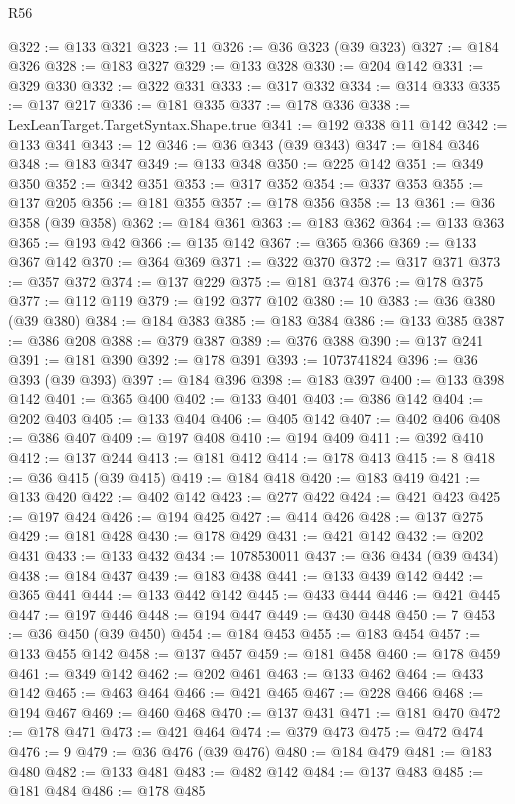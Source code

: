 \begin{lexlean}{R56}
\begin{coremodule}
@322 := @133 @321
@323 := 11
@326 := @36 @323 (@39 @323)
@327 := @184 @326
@328 := @183 @327
@329 := @133 @328
@330 := @204 @142
@331 := @329 @330
@332 := @322 @331
@333 := @317 @332
@334 := @314 @333
@335 := @137 @217
@336 := @181 @335
@337 := @178 @336
@338 := LexLeanTarget.TargetSyntax.Shape.true
@341 := @192 @338 @11 @142
@342 := @133 @341
@343 := 12
@346 := @36 @343 (@39 @343)
@347 := @184 @346
@348 := @183 @347
@349 := @133 @348
@350 := @225 @142
@351 := @349 @350
@352 := @342 @351
@353 := @317 @352
@354 := @337 @353
@355 := @137 @205
@356 := @181 @355
@357 := @178 @356
@358 := 13
@361 := @36 @358 (@39 @358)
@362 := @184 @361
@363 := @183 @362
@364 := @133 @363
@365 := @193 @42
@366 := @135 @142
@367 := @365 @366
@369 := @133 @367 @142
@370 := @364 @369
@371 := @322 @370
@372 := @317 @371
@373 := @357 @372
@374 := @137 @229
@375 := @181 @374
@376 := @178 @375
@377 := @112 @119
@379 := @192 @377 @102
@380 := 10
@383 := @36 @380 (@39 @380)
@384 := @184 @383
@385 := @183 @384
@386 := @133 @385
@387 := @386 @208
@388 := @379 @387
@389 := @376 @388
@390 := @137 @241
@391 := @181 @390
@392 := @178 @391
@393 := 1073741824
@396 := @36 @393 (@39 @393)
@397 := @184 @396
@398 := @183 @397
@400 := @133 @398 @142
@401 := @365 @400
@402 := @133 @401
@403 := @386 @142
@404 := @202 @403
@405 := @133 @404
@406 := @405 @142
@407 := @402 @406
@408 := @386 @407
@409 := @197 @408
@410 := @194 @409
@411 := @392 @410
@412 := @137 @244
@413 := @181 @412
@414 := @178 @413
@415 := 8
@418 := @36 @415 (@39 @415)
@419 := @184 @418
@420 := @183 @419
@421 := @133 @420
@422 := @402 @142
@423 := @277 @422
@424 := @421 @423
@425 := @197 @424
@426 := @194 @425
@427 := @414 @426
@428 := @137 @275
@429 := @181 @428
@430 := @178 @429
@431 := @421 @142
@432 := @202 @431
@433 := @133 @432
@434 := 1078530011
@437 := @36 @434 (@39 @434)
@438 := @184 @437
@439 := @183 @438
@441 := @133 @439 @142
@442 := @365 @441
@444 := @133 @442 @142
@445 := @433 @444
@446 := @421 @445
@447 := @197 @446
@448 := @194 @447
@449 := @430 @448
@450 := 7
@453 := @36 @450 (@39 @450)
@454 := @184 @453
@455 := @183 @454
@457 := @133 @455 @142
@458 := @137 @457
@459 := @181 @458
@460 := @178 @459
@461 := @349 @142
@462 := @202 @461
@463 := @133 @462
@464 := @433 @142
@465 := @463 @464
@466 := @421 @465
@467 := @228 @466
@468 := @194 @467
@469 := @460 @468
@470 := @137 @431
@471 := @181 @470
@472 := @178 @471
@473 := @421 @464
@474 := @379 @473
@475 := @472 @474
@476 := 9
@479 := @36 @476 (@39 @476)
@480 := @184 @479
@481 := @183 @480
@482 := @133 @481
@483 := @482 @142
@484 := @137 @483
@485 := @181 @484
@486 := @178 @485

\end{coremodule}
\end{lexlean}
